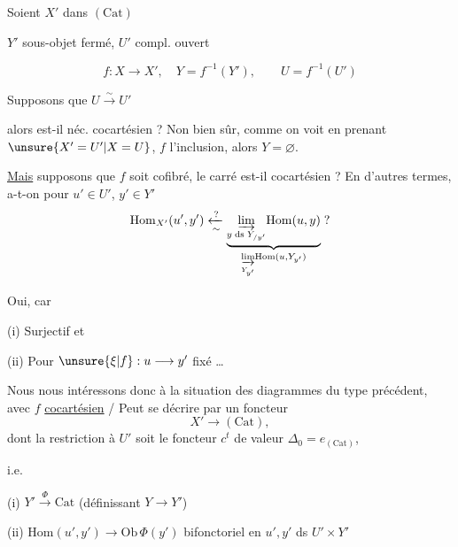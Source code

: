 

Soient $X'$ dans $(\mathrm{Cat})$

$Y'$ sous-objet fermé, $U'$ compl. ouvert


\[
f:X\longrightarrow X',\quad Y=f^{-1}(Y'),\qquad U=f^{-1}(U')
\]

Supposons que $U\xrightarrow{\sim}U'$

alors  est-il néc. cocartésien ? Non bien sûr, comme on voit en prenant $\unsure{X'=U'|X=U}$, $f$ l'inclusion, alors $Y=\varnothing$.

\uline{Mais} supposons que $f$ soit cofibré, le carré est-il cocartésien ? En d'autres termes, a-t-on pour $u'\in U'$, $y'\in Y'$
\[
\mathrm{Hom}_{X'}(u',y')\xleftarrow[\sim]{?}
\underbrace{\underset{y\;\mathrm{ds}\;Y_{/y'}}{\varinjlim}\mathrm{Hom}(u,y)}_{\underset{Y_{y'}}{\varinjlim}\mathrm{Hom}(u,Y_{y'})}\;?
\]


Oui, car 

(i) Surjectif et

(ii) Pour $\unsure{\xi|f}:u\longrightarrow y'$ fixé \ldots

Nous nous intéressons donc à la situation des diagrammes du type précédent, avec $f$ \uline{cocartésien} / Peut se décrire par un foncteur
\[
X'\longrightarrow(\mathrm{Cat}),
\]
 dont la restriction à $U'$ soit le foncteur $c^t$ de valeur $\Delta_0=e_{(\mathrm{Cat})}$,

i.e.

(i) $Y'\xrightarrow{\Phi}\mathrm{Cat}$ (définissant  $Y\longrightarrow Y'$)

(ii) $\mathrm{Hom}(u',y')\longrightarrow\mathrm{Ob}\,\Phi(y')$ bifonctoriel en $u',y'$ ds $U'\times Y'$
